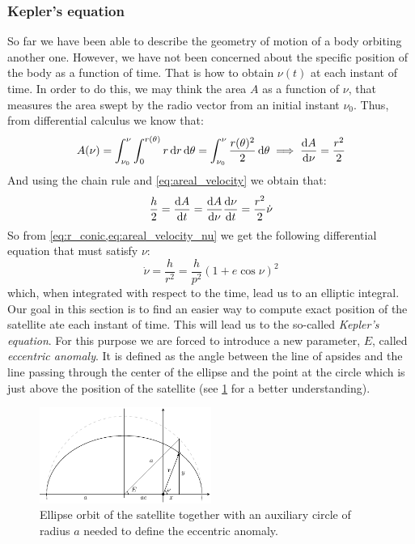 \documentclass[../main.tex]{subfiles}
\begin{document}
\subsubsection{Kepler's equation}
So far we have been able to describe the geometry of motion of a body orbiting another one. However, we have not been concerned about the specific position of the body as a function of time. That is how to obtain $\nu(t)$ at each instant of time. In order to do this, we may think the area $A$ as a function of $\nu$, that measures the area swept by the radio vector from an initial instant $\nu_0$. Thus, from differential calculus we know that:
\begin{equation}
  A(\nu)=\int_{\nu_0}^{\nu}\int_{0}^{r(\theta)}r\dd{r}\dd{\theta}=\int_{\nu_0}^{\nu}\frac{r(\theta)^2}{2}\dd{\theta}\implies\dv{A}{\nu}=\frac{r^2}{2}
\end{equation}
And using the chain rule and \cref{eq:areal_velocity} we obtain that:
\begin{equation}\label{eq:areal_velocity_nu}
  \frac{h}{2}=\dv{A}{t}=\dv{A}{\nu}\dv{\nu}{t}=\frac{r^2}{2}\dot\nu
\end{equation}
So from \cref{eq:r_conic,eq:areal_velocity_nu} we get the following differential equation that must satisfy $\nu$:
\begin{equation}
  \dot\nu=\frac{h}{r^2}=\frac{h}{p^2}{(1+e\cos\nu)}^2
\end{equation}
which, when integrated with respect to the time, lead us to an elliptic integral. Our goal in this section is to find an easier way to compute exact position of the satellite ate each instant of time. This will lead us to the so-called \emph{Kepler's equation}. For this purpose we are forced to introduce a new parameter, $E$, called \emph{eccentric anomaly}. It is defined as the angle between the line of apsides and the line passing through the center of the ellipse and the point at the circle which is just above the position of the satellite (see \cref{fig:kepler_eq} for a better understanding).
\begin{figure}[ht]
  \centering
  \includegraphics[width=0.5\textwidth]{Images/kepler_eq.pdf}
  \caption{Ellipse orbit of the satellite together with an auxiliary circle of radius $a$ needed to define the eccentric anomaly.}
  \label{fig:kepler_eq}
\end{figure}
\end{document}
